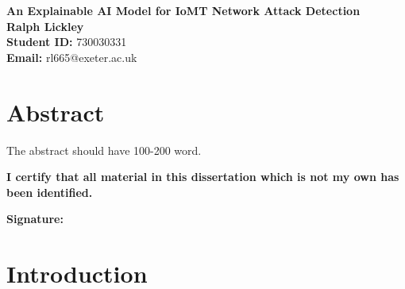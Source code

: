\documentclass[11pt,a4paper]{article}
\begin{document}
\singlespacing  %
\thispagestyle{empty} %

\begin{center}
{\bf \LARGE An Explainable AI Model for IoMT Network Attack Detection}\\[0.5cm]
    \textbf{Ralph Lickley} \\[0.2cm]
    \textbf{Student ID:} 730030331 \\[1cm]
    \textbf{Email:} rl665@exeter.ac.uk \\[1cm]
\end{center}

\section*{Abstract}

\noindent 
The abstract should have 100-200 word.

\vspace*{\fill}

\begin{checkbox}
    \item {\bf I certify that all material in this dissertation which is not my own has been identified.}
\end{checkbox}


\vspace{1em}
{\bf\noindent Signature:} \hrulefill

\newpage
\clearpage
{} 
%
%
\section{Introduction}
\end{document}

